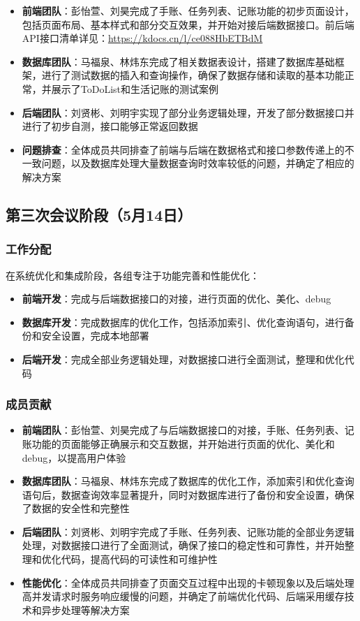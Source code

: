 \documentclass[a4paper]{article}
\begin{document}
\begin{itemize}
    \item \textbf{前端团队}：彭怡萱、刘昊完成了手账、任务列表、记账功能的初步页面设计，包括页面布局、基本样式和部分交互效果，并开始对接后端数据接口。前后端API接口清单详见：\url{https://kdocs.cn/l/ce088HbETBdM}
    \item \textbf{数据库团队}：马福泉、林炜东完成了相关数据表设计，搭建了数据库基础框架，进行了测试数据的插入和查询操作，确保了数据存储和读取的基本功能正常，并展示了ToDoList和生活记账的测试案例
    \item \textbf{后端团队}：刘贤彬、刘明宇实现了部分业务逻辑处理，开发了部分数据接口并进行了初步自测，接口能够正常返回数据
    \item \textbf{问题排查}：全体成员共同排查了前端与后端在数据格式和接口参数传递上的不一致问题，以及数据库处理大量数据查询时效率较低的问题，并确定了相应的解决方案
\end{itemize}

\subsection{第三次会议阶段（5月14日）}

\subsubsection{工作分配}

在系统优化和集成阶段，各组专注于功能完善和性能优化：

\begin{itemize}
    \item \textbf{前端开发}：完成与后端数据接口的对接，进行页面的优化、美化、debug
    \item \textbf{数据库开发}：完成数据库的优化工作，包括添加索引、优化查询语句，进行备份和安全设置，完成本地部署
    \item \textbf{后端开发}：完成全部业务逻辑处理，对数据接口进行全面测试，整理和优化代码
\end{itemize}

\subsubsection{成员贡献}

\begin{itemize}
    \item \textbf{前端团队}：彭怡萱、刘昊完成了与后端数据接口的对接，手账、任务列表、记账功能的页面能够正确展示和交互数据，并开始进行页面的优化、美化和debug，以提高用户体验
    \item \textbf{数据库团队}：马福泉、林炜东完成了数据库的优化工作，添加索引和优化查询语句后，数据查询效率显著提升，同时对数据库进行了备份和安全设置，确保了数据的安全性和完整性
    \item \textbf{后端团队}：刘贤彬、刘明宇完成了手账、任务列表、记账功能的全部业务逻辑处理，对数据接口进行了全面测试，确保了接口的稳定性和可靠性，并开始整理和优化代码，提高代码的可读性和可维护性
    \item \textbf{性能优化}：全体成员共同排查了页面交互过程中出现的卡顿现象以及后端处理高并发请求时服务响应缓慢的问题，并确定了前端优化代码、后端采用缓存技术和异步处理等解决方案
\end{itemize}
\end{document}
